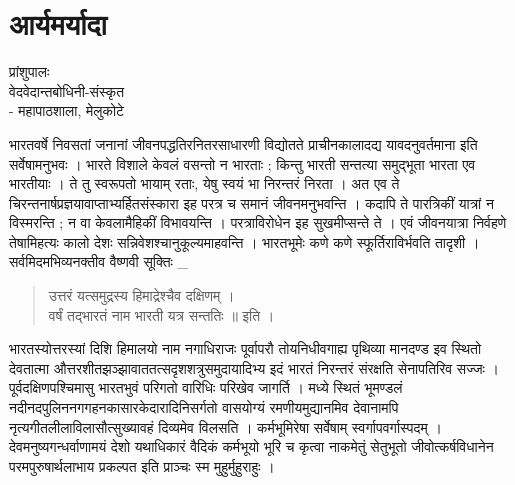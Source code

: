\chapter{आर्यमर्यादा}

\begin{center}
\smallskip

प्रांशुपालः\\
वेदवेदान्तबोधिनी-संस्कृत\\
- महापाठशाला, मेलुकोटे
\end{center}

भारतवर्षे निवसतां जनानां जीवनपद्धतिरनितरसाधारणी विद्योतते प्राचीनकालादद्य यावदनुवर्तमाना इति सर्वेषामनुभवः । भारते विशाले केवलं वसन्तो न भारताः ; किन्तु भारती सन्तत्या समुद्भूता भारता एव भारतीयाः । ते तु स्वरूपतो भायाम् रताः, येषु स्वयं भा निरन्तरं निरता । अत एव ते चिरन्तनार्षप्रज्ञयावाप्ताभ्यर्हितसंस्कारा इह परत्र च समानं जीवनमनुभवन्ति । कदापि ते पारत्रिकीं यात्रां न विस्मरन्ति ; न वा केवलामैहिकीं विभावयन्ति । परत्राविरोधेन इह सुखमीप्सन्ते ते । एवं जीवनयात्रा निर्वहणे तेषामिहत्यः कालो देशः सन्निवेशश्चानुकूल्यमाहवन्ति । भारतभूमेः कणे कणे स्फूर्तिराविर्भवति तादृशी । सर्वमिदमभिव्यनक्तीव वैष्णवी सूक्तिः _ 
\begin{verse}
उत्तरं यत्समुद्रस्य हिमाद्रेश्चैव दक्षिणम् ।\\
वर्षं तद्भारतं नाम भारती यत्र सन्ततिः ॥ इति ।
\end{verse}
भारतस्योत्तरस्यां दिशि हिमालयो नाम नगाधिराजः पूर्वापरौ तोयनिधीवगाह्य पृथिव्या मानदण्ड इव स्थितो देवतात्मा औत्तरशीतझञ्झावाततत्सदृशशत्रुसमुदायादिभ्य इदं भारतं निरन्तरं संरक्षति सेनापतिरिव सज्जः । पूर्वदक्षिणपश्चिमासु भारतभुवं परिगतो वारिधिः परिखेव जागर्ति । मध्ये स्थितं  भूमण्डलं नदीनदपुलिननगगहनकासारकेदारादिनिसर्गतो वासयोग्यं रमणीयमुद्यानमिव देवानामपि नृत्यगीतलीलाविलासौत्सुख्यावहं दिव्यमेव विलसति । कर्मभूमिरेषा सर्वेषाम् स्वर्गापवर्गास्पदम् । देवमनुष्यगन्धर्वाणामयं देशो यथाधिकारं वैदिकं कर्मभूयो भूरि च कृत्वा नाकमेतुं सेतुभूतो जीवोत्कर्षविधानेन परमपुरुषार्थलाभाय प्रकल्पत इति प्राञ्चः स्म मुहुर्मुहुराहुः ।

